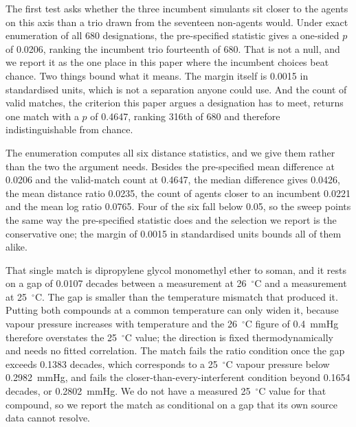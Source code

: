 \documentclass[journal=jacsat,manuscript=suppinfo,margin=1in]{achemso}
\begin{document}
The first test asks whether the three incumbent simulants sit closer to the
agents on this axis than a trio drawn from the seventeen non-agents would.
Under exact enumeration of all 680 designations, the pre-specified statistic
gives a one-sided $p$ of 0.0206, ranking the incumbent trio fourteenth of 680.
That is not a null, and we report it as the one place in this paper where the
incumbent choices beat chance. Two things bound what it means. The margin
itself is 0.0015 in standardised units, which is not a separation anyone could
use. And the count of valid matches, the criterion this paper argues a
designation has to meet, returns one match with a $p$ of 0.4647, ranking 316th
of 680 and therefore indistinguishable from chance.

The enumeration computes all six distance statistics, and we give them rather
than the two the argument needs. Besides the pre-specified mean difference at
0.0206 and the valid-match count at 0.4647, the median difference gives 0.0426,
the mean distance ratio 0.0235, the count of agents closer to an incumbent
0.0221 and the mean log ratio 0.0765. Four of the six fall below 0.05, so the
sweep points the same way the pre-specified statistic does and the selection
we report is the conservative one; the margin of 0.0015 in standardised units
bounds all of them alike.

That single match is dipropylene glycol monomethyl ether to soman, and it
rests on a gap of 0.0107 decades between a measurement at 26~$^{\circ}$C and a
measurement at 25~$^{\circ}$C. The gap is smaller than the temperature
mismatch that produced it. Putting both compounds at a common temperature can
only widen it, because vapour pressure increases with temperature and the
26~$^{\circ}$C figure of 0.4~mmHg therefore overstates the 25~$^{\circ}$C
value; the direction is fixed thermodynamically and needs no fitted
correlation. The match fails the ratio condition once the gap exceeds 0.1383
decades, which corresponds to a 25~$^{\circ}$C vapour pressure below
0.2982~mmHg, and fails the closer-than-every-interferent condition beyond
0.1654 decades, or 0.2802~mmHg. We do not have a measured 25~$^{\circ}$C value
for that compound, so we report the match as conditional on a gap that its own
source data cannot resolve.
\end{document}
